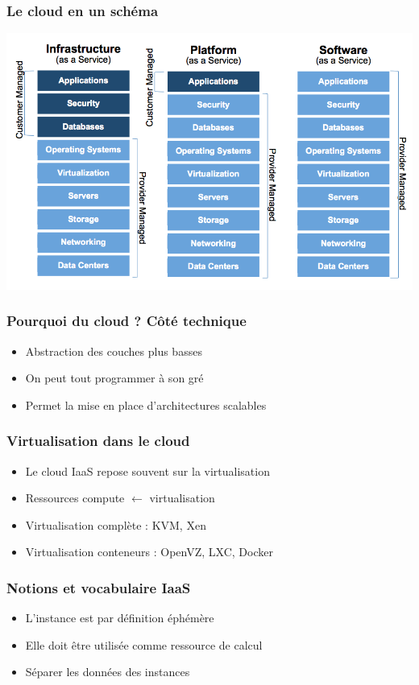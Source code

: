   \begin{frame}
    \frametitle{Le cloud en un schéma}
    \includegraphics[width=\linewidth,height=\textheight]{images/cloud.png}
  \end{frame}

  \begin{frame}
    \frametitle{Pourquoi du cloud ? Côté technique}
    \begin{itemize}
      \item Abstraction des couches plus basses
      \item On peut tout programmer à son gré
      \item Permet la mise en place d'architectures scalables
    \end{itemize}
  \end{frame}

  \begin{frame}
    \frametitle{Virtualisation dans le cloud}
    \begin{itemize}
      \item Le cloud IaaS repose souvent sur la virtualisation
      \item Ressources compute $\leftarrow$ virtualisation
      \item Virtualisation complète : KVM, Xen
      \item Virtualisation conteneurs : OpenVZ, LXC, Docker
    \end{itemize}
  \end{frame}

  \begin{frame}
    \frametitle{Notions et vocabulaire IaaS}
    \begin{itemize}
      \item L'instance est par définition éphémère
      \item Elle doit être utilisée comme ressource de calcul
      \item Séparer les données des instances
    \end{itemize}
  \end{frame}

